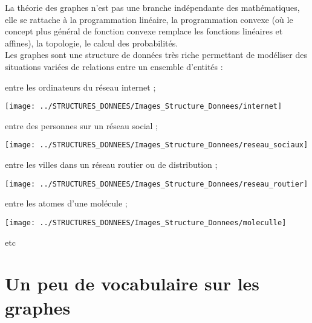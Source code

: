 \documentclass[12pt]{book}
\begin{document}
La théorie des graphes n'est pas une branche indépendante des mathématiques, elle se rattache à la programmation
linéaire, la programmation convexe (où le concept plus général de fonction convexe remplace les fonctions linéaires
et affines), la topologie, le calcul des probabilités.\\


Les graphes sont une structure de données très riche permettant de modéliser des situations variées de relations entre un ensemble d'entités :
\begin{liste}
	\item entre les ordinateurs du réseau internet ;

\begin{center}
	\texttt{[image: ../STRUCTURES\_DONNEES/Images\_Structure\_Donnees/internet]}
\end{center}
\newpage
\item entre des personnes sur un réseau social ;

\begin{center}
	\texttt{[image: ../STRUCTURES\_DONNEES/Images\_Structure\_Donnees/reseau\_sociaux]}
\end{center}

\item entre les villes dans un réseau routier ou de distribution ;

\begin{center}
	\texttt{[image: ../STRUCTURES\_DONNEES/Images\_Structure\_Donnees/reseau\_routier]}
\end{center}

\item entre les atomes d'une molécule ; 

\begin{center}
	\texttt{[image: ../STRUCTURES\_DONNEES/Images\_Structure\_Donnees/moleculle]}
\end{center}

\item etc

\end{liste}


\section{Un peu de vocabulaire sur les graphes}

\end{document}
